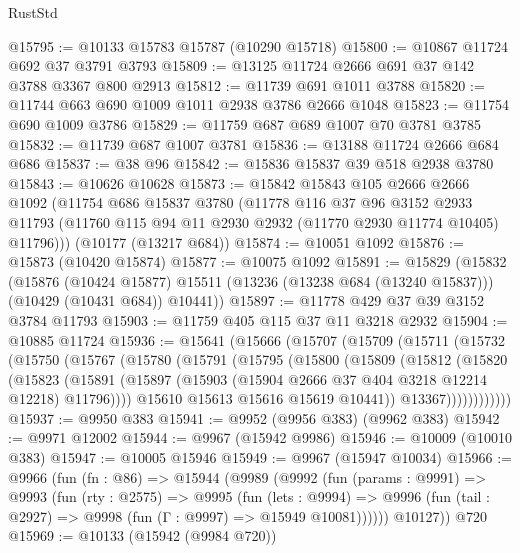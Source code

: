 \begin{lexlean}{RustStd}
\begin{coremodule}
{\begin{coremodule}
{{{{{{{{{{{{{{{{{{{{{{{{{{{{{{{{{{{{{{{{{{{{{{{{{{{{{{{{{{{{{{{{{{{{{{{{{{{{{{@15795 := @10133 @15783 @15787 (@10290 @15718)
@15800 := @10867 @11724 @692 @37 @3791 @3793
@15809 := @13125 @11724 @2666 @691 @37 @142 @3788 @3367 @800 @2913
@15812 := @11739 @691 @1011 @3788
@15820 := @11744 @663 @690 @1009 @1011 @2938 @3786 @2666 @1048
@15823 := @11754 @690 @1009 @3786
@15829 := @11759 @687 @689 @1007 @70 @3781 @3785
@15832 := @11739 @687 @1007 @3781
@15836 := @13188 @11724 @2666 @684 @686
@15837 := @38 @96
@15842 := @15836 @15837 @39 @518 @2938 @3780
@15843 := @10626 @10628
@15873 := @15842
    @15843
    @105
    @2666
    @2666
    @1092
    (@11754
      @686
      @15837
      @3780
      (@11778
        @116
        @37
        @96
        @3152
        @2933
        @11793
        (@11760 @115 @94 @11 @2930 @2932 (@11770 @2930 @11774 @10405) @11796)))
    (@10177 (@13217 @684))
@15874 := @10051 @1092
@15876 := @15873 (@10420 @15874)
@15877 := @10075 @1092
@15891 := @15829
    (@15832
      (@15876
        (@10424 @15877)
        @15511
        (@13236 (@13238 @684 (@13240 @15837)))
        (@10429 (@10431 @684))
        @10441))
@15897 := @11778 @429 @37 @39 @3152 @3784 @11793
@15903 := @11759 @405 @115 @37 @11 @3218 @2932
@15904 := @10885 @11724
@15936 := @15641
    (@15666
      (@15707
        (@15709
          (@15711
            (@15732
              (@15750
                (@15767
                  (@15780
                    (@15791
                      (@15795
                        (@15800
                          (@15809
                            (@15812
                              (@15820
                                (@15823
                                  (@15891
                                    (@15897
                                      (@15903 (@15904 @2666 @37 @404 @3218 @12214 @12218) @11796))))
                                @15610
                                @15613
                                @15616
                                @15619
                                @10441))
                            @13367))))))))))))
@15937 := @9950 @383
@15941 := @9952 (@9956 @383) (@9962 @383)
@15942 := @9971 @12002
@15944 := @9967 (@15942 @9986)
@15946 := @10009 (@10010 @383)
@15947 := @10005 @15946
@15949 := @9967 (@15947 @10034)
@15966 := @9966
    (fun (fn : @86) =>
    @15944
      (@9989
        (@9992
          (fun (params : @9991) =>
          @9993
            (fun (rty : @2575) =>
            @9995
              (fun (lets : @9994) =>
              @9996 (fun (tail : @2927) => @9998 (fun (Γ : @9997) => @15949 @10081))))))
        @10127))
    @720
@15969 := @10133 (@15942 (@9984 @720))
}}}}}}}}}}}}}}}}}}}}}}}}}}}}}}}}}}}}}}}}}}}}}}}}}}}}}}}}}}}}}}}}}}}}}}}}}}}}}}
\end{coremodule}}
\end{coremodule}
\end{lexlean}
